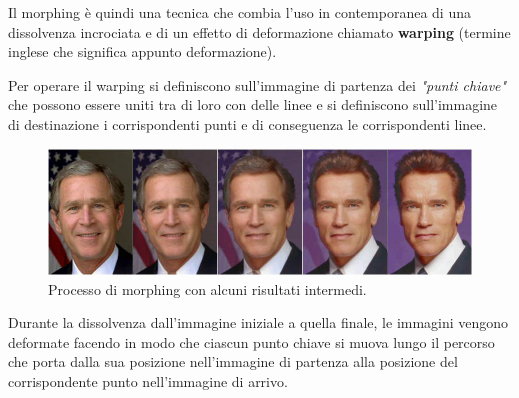 \vspace{1em} \noindent
Il morphing è quindi una tecnica che combia l'uso in contemporanea di una dissolvenza incrociata e di un effetto di deformazione chiamato \textbf{warping} (termine inglese che significa appunto deformazione).

\vspace{1em} \noindent
Per operare il warping si definiscono sull'immagine di partenza dei \textit{"punti chiave"} che possono essere uniti tra di loro con delle linee e si definiscono sull'immagine di destinazione i corrispondenti punti e di conseguenza le corrispondenti linee.\\ 
\begin{figure}[htb] \centering
\includegraphics[scale=0.5, trim = 0 1.1cm 0 0, clip]{Pictures/Striscia_morphing.jpg}
\caption{Processo di morphing con alcuni risultati intermedi.}\label{fig:figura}
\end{figure}

\noindent
Durante la dissolvenza dall'immagine iniziale a quella finale, le immagini vengono deformate facendo in modo che ciascun punto chiave si muova lungo il percorso che porta dalla sua posizione nell'immagine di partenza alla posizione del corrispondente punto nell'immagine di arrivo.